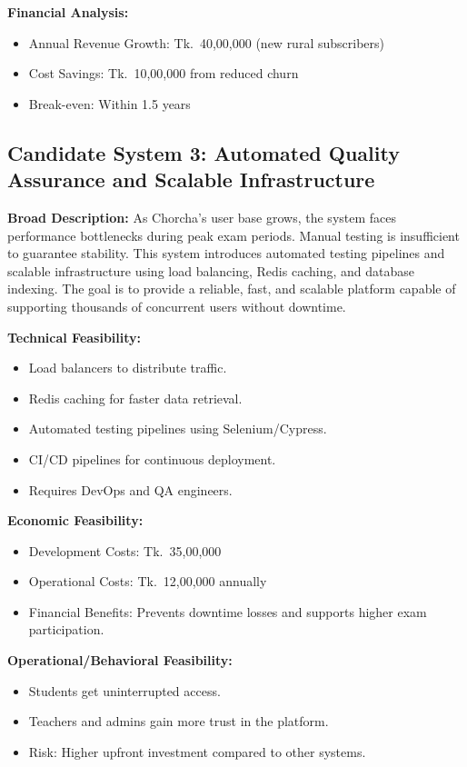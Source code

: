 \documentclass[12pt,a4paper,oneside]{book}
\begin{document}
\textbf{Financial Analysis:}
\begin{itemize}
    \item Annual Revenue Growth: Tk.~40,00,000 (new rural subscribers)
    \item Cost Savings: Tk.~10,00,000 from reduced churn
    \item Break-even: Within 1.5 years
\end{itemize}

\subsection{Candidate System 3: Automated Quality Assurance and Scalable Infrastructure}

\textbf{Broad Description:}
As Chorcha’s user base grows, the system faces performance bottlenecks during peak exam periods. Manual testing is insufficient to guarantee stability. This system introduces automated testing pipelines and scalable infrastructure using load balancing, Redis caching, and database indexing. The goal is to provide a reliable, fast, and scalable platform capable of supporting thousands of concurrent users without downtime.

\textbf{Technical Feasibility:}
\begin{itemize}
    \item Load balancers to distribute traffic.
    \item Redis caching for faster data retrieval.
    \item Automated testing pipelines using Selenium/Cypress.
    \item CI/CD pipelines for continuous deployment.
    \item Requires DevOps and QA engineers.
\end{itemize}

\textbf{Economic Feasibility:}
\begin{itemize}
    \item Development Costs: Tk.~35,00,000
    \item Operational Costs: Tk.~12,00,000 annually
    \item Financial Benefits: Prevents downtime losses and supports higher exam participation.
\end{itemize}

\textbf{Operational/Behavioral Feasibility:}
\begin{itemize}
    \item Students get uninterrupted access.
    \item Teachers and admins gain more trust in the platform.
    \item Risk: Higher upfront investment compared to other systems.
\end{itemize}
\end{document}
